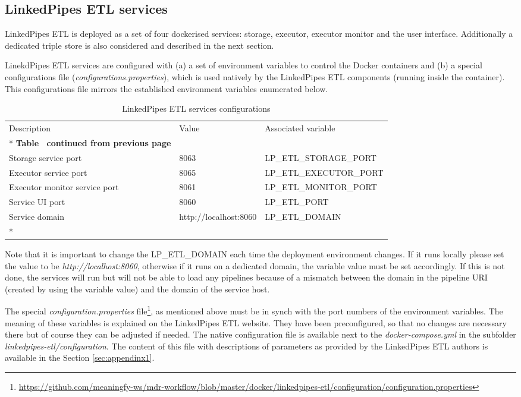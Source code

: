 	\subsection{LinkedPipes ETL services}
	
	LinkedPipes ETL is deployed as a set of four dockerised services: storage, executor, executor monitor and the user interface. Additionally a dedicated triple store is also considered and described in the next section. 
	
	LinekdPipes ETL services are configured with  (a) a set of environment variables to control the Docker containers and (b) a special configurations file (\textit{configurations.properties}), which is used natively by the LinkedPipes ETL components (running inside the container). This configurations file mirrors the  established environment variables enumerated below.

	
	\begin{longtable}[c]{@{}p{5cm}p{4cm}l@{}}
		\toprule
		Description & Value & Associated variable \\* \midrule
		\endfirsthead
		\multicolumn{3}{c}%
		{{\bfseries Table \thetable\ continued from previous page}} \\
		\endhead
		\bottomrule
		\endfoot
		\endlastfoot
		Storage service port & 8063 & LP\_ETL\_STORAGE\_PORT \\		
		Executor service port & 8065 & LP\_ETL\_EXECUTOR\_PORT \\
		Executor monitor service port & 8061 & LP\_ETL\_MONITOR\_PORT \\		
		Service UI port & 8060 & LP\_ETL\_PORT \\
		Service domain & http://localhost:8060 & LP\_ETL\_DOMAIN \\* \bottomrule
		\caption{LinkedPipes ETL services configurations}
		\label{tab:my-table5}\\
	\end{longtable}
	
	Note that it is important to change the LP\_ETL\_DOMAIN each time the deployment environment changes. If it runs locally please set the value to be \textit{http://localhost:8060}, otherwise if it runs on a dedicated domain, the variable value must be set accordingly. If this is not done, the services will run but will not be able to load any pipelines because of a mismatch between the domain in the pipeline URI (created by using the variable value) and the domain of the service host. 
	
	The special \textit{configuration.properties} file\footnote{\url{https://github.com/meaningfy-ws/mdr-workflow/blob/master/docker/linkedpipes-etl/configuration/configuration.properties}}, as mentioned above must be in synch with the port numbers of the environment variables. The meaning of these variables is explained on the LinkedPipes ETL website. They have been preconfigured, so that no changes are necessary there but of course they can be adjusted if needed. The native configuration file is available next to the \textit{docker-compose.yml} in the subfolder \textit{linkedpipes-etl/configuration}. The content of this file with descriptions of parameters as provided by the LinkedPipes ETL authors is available in the Section \ref{sec:appendinx1}. 	
	
